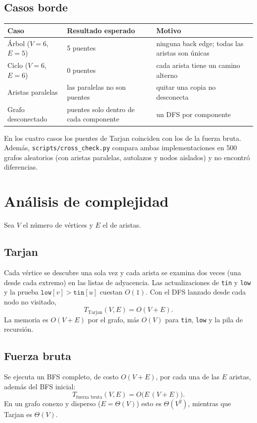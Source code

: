 \documentclass[11pt,a4paper]{article}
\begin{document}
\subsection{Casos borde}
\begin{center}
\begin{tabular}{lll}
\toprule
Caso & Resultado esperado & Motivo\\
\midrule
Árbol ($V=6$, $E=5$) & 5 puentes & ninguna back edge; todas las aristas son únicas\\
Ciclo ($V=6$, $E=6$) & 0 puentes & cada arista tiene un camino alterno\\
Aristas paralelas & las paralelas no son puentes & quitar una copia no desconecta\\
Grafo desconectado & puentes solo dentro de cada componente & un DFS por componente\\
\bottomrule
\end{tabular}
\end{center}
En los cuatro casos los puentes de Tarjan coinciden con los de la fuerza bruta. Además,
\texttt{scripts/cross\_check.py} compara ambas implementaciones en 500 grafos aleatorios (con aristas
paralelas, autolazos y nodos aislados) y no encontró diferencias.

\section{Análisis de complejidad}
Sea $V$ el número de vértices y $E$ el de aristas.

\subsection{Tarjan}
Cada vértice se descubre una sola vez y cada arista se examina dos veces (una desde cada extremo) en
las listas de adyacencia. Las actualizaciones de \texttt{tin} y \texttt{low} y la prueba
$\texttt{low}[v] > \texttt{tin}[u]$ cuestan $O(1)$. Con el DFS lanzado desde cada nodo no visitado,
\[ T_{\text{Tarjan}}(V,E) = O(V+E). \]
La memoria es $O(V+E)$ por el grafo, más $O(V)$ para \texttt{tin}, \texttt{low} y la pila de recursión.

\subsection{Fuerza bruta}
Se ejecuta un BFS completo, de costo $O(V+E)$, por cada una de las $E$ aristas, además del BFS inicial:
\[ T_{\text{fuerza bruta}}(V,E) = O\big(E\,(V+E)\big). \]
En un grafo conexo y disperso ($E=\Theta(V)$) esto es $\Theta(V^2)$, mientras que Tarjan es $\Theta(V)$.
\end{document}
